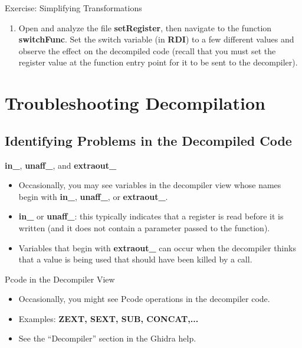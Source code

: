 \documentclass{beamer}
\begin{document}
\begin{frame}
\begin{block}{Exercise: Simplifying Transformations}
\begin{enumerate}
\item Open and analyze the file \textbf{setRegister}, then navigate to the function \textbf{switchFunc}.  Set the switch variable (in \textbf{RDI}) to a few 
different values and observe the effect on the decompiled code (recall that you must set the register value at the function entry point for it to be sent
to the decompiler).
\end{enumerate}
\end{block}
\end{frame}


\section{Troubleshooting Decompilation}

\subsection{Identifying Problems in the Decompiled Code}

\begin{frame}
\begin{block}{\textbf{in\_}, \textbf{unaff\_}, and \textbf{extraout\_}}
\begin{itemize}
\item Occasionally, you may see variables in the decompiler view whose names begin with \textbf{in\_}, \textbf{unaff\_}, or \textbf{extraout\_}.
\item \textbf{in\_} or \textbf{unaff\_}: this typically indicates that a register is read before it is written (and it does not contain a parameter passed to the function).
\item Variables that begin with \textbf{extraout\_} can occur when the decompiler thinks that a value is being used that should have been killed by a call. 
\end{itemize}
\end{block}
\end{frame}

\begin{frame}
\begin{block}{Pcode in the Decompiler View}
\begin{itemize}
\item Occasionally, you might see Pcode operations in the decompiler code. 
\item Examples: \textbf{ZEXT, SEXT, SUB, CONCAT,...}
\item See the ``Decompiler'' section in the Ghidra help. 
\end{itemize}
\end{block}
\end{frame}
\end{document}
